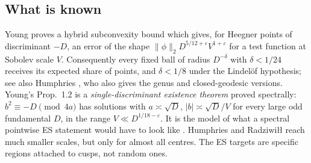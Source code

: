 \documentclass[10pt,reqno]{amsart}
\theoremstyle{definition}
\numberwithin{equation}{section}
\begin{document}
\subsection{What is known}
Young \cite[Thm.~2.1]{Yo} proves a hybrid subconvexity bound which gives,
for Heegner points of discriminant $-D$, an error of the shape
$\|\phi\|_2D^{5/12+\varepsilon}V^{1+\varepsilon}$ for a test function at Sobolev
scale $V$. Consequently every fixed ball of radius $D^{-\delta}$ with
$\delta<1/24$ receives its expected share of points, and $\delta<1/8$ under
the Lindel\"of hypothesis; see also Humphries \cite{Hu}, who also gives the
genus and closed-geodesic versions. Young's Prop.~1.2 is a
\emph{single-discriminant existence theorem} proved spectrally:
$b^2\equiv-D\pmod{4a}$ has solutions with $a\asymp\sqrt D$,
$|b|\asymp\sqrt D/V$ for every large odd fundamental $D$, in the range
$V\ll D^{1/18-\varepsilon}$. It is the model of what a spectral pointwise ES
statement would have to look like \cite{LA}. Humphries and Radziwi\l\l
\cite{HR} reach much smaller scales, but only for almost all centres. The
ES targets are specific regions attached to cusps, not random ones.
\end{document}
